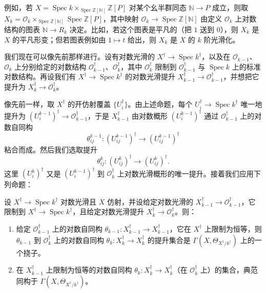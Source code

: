 例如，若 $X=\operatorname{Spec} k\times_{\operatorname{Spec}\mathbb{Z}[\mathbb{N}]}\mathbb{Z}[P]$ 对某个幺半群同态 $\mathbb{N}\to P$ 成立，则取 $X_k=\mathcal{O}_k\times_{\operatorname{Spec}\mathbb{Z}[\mathbb{N}]}\operatorname{Spec}\mathbb{Z}[P]$，其中映射 $\mathcal{O}_k\to\operatorname{Spec}\mathbb{Z}[\mathbb{N}]$ 由定义 $\mathcal{O}_k$ 上对数结构的图表 $\mathbb{N}\to R_k$ 决定。比如，若这个图表是平凡的（把 $1$ 送到 $0$），则 $X_k$ 是 $X$ 的平凡形变；但若图表例如由 $1\mapsto t$ 给出，则 $X_k$ 是 $X$ 的 $k$ 阶光滑化。


我们现在可以像先前那样进行。设有对数光滑的 $X^{\dagger}\to\operatorname{Spec} k^{\dagger}$，以及在 $\mathcal{O}_{k-1}$、$\mathcal{O}_k$ 上分别给定的对数结构 $\mathcal{O}_{k-1}^{\dagger}$、$\mathcal{O}_k^{\dagger}$，其中 $\mathcal{O}_k^{\dagger}$ 限制到 $\mathcal{O}_{k-1}^{\dagger}$ 与 $\operatorname{Spec} k$ 上的标准对数结构。再设我们有 $X^{\dagger}\to\operatorname{Spec} k^{\dagger}$ 的对数光滑提升 $X_{k-1}^{\dagger}\to\mathcal{O}_{k-1}^{\dagger}$，并想把它提升为 $X_k^{\dagger}\to\mathcal{O}_k^{\dagger}$。

像先前一样，取 $X^{\dagger}$ 的开仿射覆盖 $\{U_i^{\dagger}\}$。由上述命题，每个 $U_i^{\dagger}\to\operatorname{Spec} k^{\dagger}$ 唯一地提升为 $(U_i^{k-1})^{\dagger}\to\mathcal{O}_{k-1}^{\dagger}$，于是 $X_{k-1}^{\dagger}$ 由对数概形 $(U_i^{k-1})^{\dagger}$ 通过 $\mathcal{O}_{k-1}^{\dagger}$ 上的对数自同构
\[
  \theta_{ij}^{k-1}:(U_{ij}^{k-1})^{\dagger}\to(U_{ij}^{k-1})^{\dagger}
\]
粘合而成。然后我们选取提升
\[
  \theta_{ij}^{k}:(U_{ij}^{k})^{\dagger}\to(U_{ij}^{k})^{\dagger}.
\]
这里 $(U_i^{k})^{\dagger}$ 又是 $(U_i^{k-1})^{\dagger}$ 到 $\mathcal{O}_k^{\dagger}$ 上对数光滑概形的唯一提升。接着我们应用下列命题：

\begin{proposition}
设 $X^{\dagger}\to\operatorname{Spec} k^{\dagger}$ 对数光滑且 $X$ 仿射，并设给定对数光滑的 $X_{k-1}^{\dagger}\to\mathcal{O}_{k-1}^{\dagger}$，它限制到 $X^{\dagger}\to\operatorname{Spec} k^{\dagger}$，且给定对数光滑提升 $X_k^{\dagger}\to\mathcal{O}_k^{\dagger}$。则：
\begin{enumerate}[label=(\arabic*)]
\item 给定 $\mathcal{O}_{k-1}^{\dagger}$ 上的对数自同构 $\theta_{k-1}:X_{k-1}^{\dagger}\to X_{k-1}^{\dagger}$，它在 $X^{\dagger}$ 上限制为恒等，则 $\theta_{k-1}$ 到 $\mathcal{O}_k^{\dagger}$ 上的对数自同构 $\theta_k:X_k^{\dagger}\to X_k^{\dagger}$ 的提升集合是 $\Gamma(X,\Theta_{X^{\dagger}/k^{\dagger}})$ 上的一个挠子。
\item 在 $X_{k-1}^{\dagger}$ 上限制为恒等的对数自同构 $\theta_k:X_k^{\dagger}\to X_k^{\dagger}$（在 $\mathcal{O}_k^{\dagger}$ 上）的集合，典范同构于 $\Gamma(X,\Theta_{X^{\dagger}/k^{\dagger}})$。
\end{enumerate}
\end{proposition}


